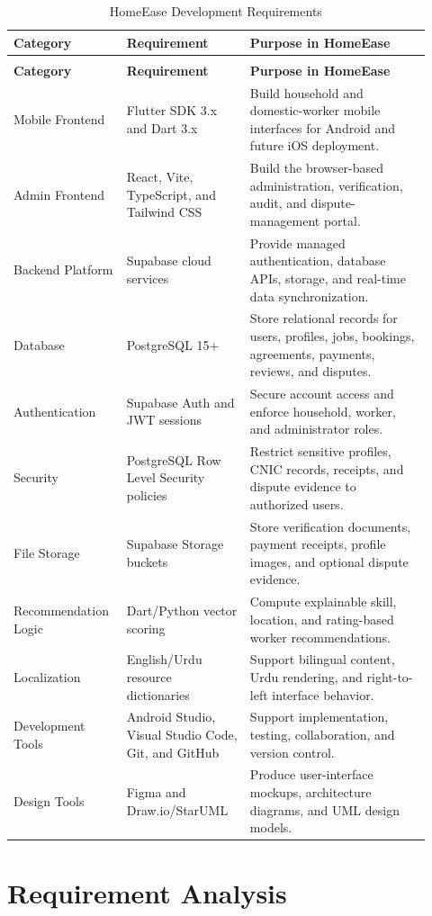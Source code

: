\documentclass[12pt,a4paper]{article}
\begin{document}
\begingroup\small\setlength{\tabcolsep}{4pt}\renewcommand{\arraystretch}{1.15}
\begin{longtable}{|>{\raggedright\arraybackslash}p{0.22\linewidth}|>{\raggedright\arraybackslash}p{0.29\linewidth}|>{\raggedright\arraybackslash}p{0.41\linewidth}|}
\caption{HomeEase Development Requirements}\label{tab:development-requirements}\\
\hline
\textbf{Category} & \textbf{Requirement} & \textbf{Purpose in HomeEase} \\ \hline
\endfirsthead
\multicolumn{3}{c}{Table \thetable\ HomeEase Development Requirements (continued)}\\
\hline
\textbf{Category} & \textbf{Requirement} & \textbf{Purpose in HomeEase} \\ \hline
\endhead
Mobile Frontend & Flutter SDK 3.x and Dart 3.x & Build household and domestic-worker mobile interfaces for Android and future iOS deployment. \\ \hline
Admin Frontend & React, Vite, TypeScript, and Tailwind CSS & Build the browser-based administration, verification, audit, and dispute-management portal. \\ \hline
Backend Platform & Supabase cloud services & Provide managed authentication, database APIs, storage, and real-time data synchronization. \\ \hline
Database & PostgreSQL 15+ & Store relational records for users, profiles, jobs, bookings, agreements, payments, reviews, and disputes. \\ \hline
Authentication & Supabase Auth and JWT sessions & Secure account access and enforce household, worker, and administrator roles. \\ \hline
Security & PostgreSQL Row Level Security policies & Restrict sensitive profiles, CNIC records, receipts, and dispute evidence to authorized users. \\ \hline
File Storage & Supabase Storage buckets & Store verification documents, payment receipts, profile images, and optional dispute evidence. \\ \hline
Recommendation Logic & Dart/Python vector scoring & Compute explainable skill, location, and rating-based worker recommendations. \\ \hline
Localization & English/Urdu resource dictionaries & Support bilingual content, Urdu rendering, and right-to-left interface behavior. \\ \hline
Development Tools & Android Studio, Visual Studio Code, Git, and GitHub & Support implementation, testing, collaboration, and version control. \\ \hline
Design Tools & Figma and Draw.io/StarUML & Produce user-interface mockups, architecture diagrams, and UML design models. \\ \hline
\end{longtable}
\endgroup
\clearpage\section{Requirement Analysis}
\end{document}
